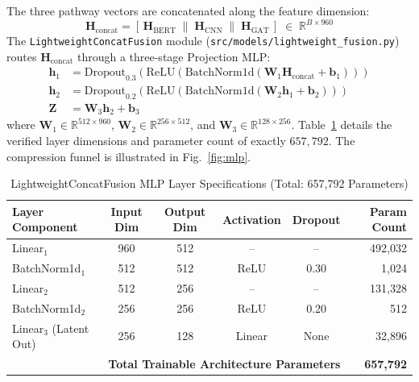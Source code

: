 \documentclass[conference]{IEEEtran}
\begin{document}
The three pathway vectors are concatenated along the feature dimension:
\begin{equation}
    \mathbf{H}_{\text{concat}} = \left[\, \mathbf{H}_{\text{BERT}} \;\|\; \mathbf{H}_{\text{CNN}} \;\|\; \mathbf{H}_{\text{GAT}} \,\right] \;\in\; \mathbb{R}^{B \times 960}
    \label{eq:concat}
\end{equation}
The \texttt{LightweightConcatFusion} module (\texttt{src/models/lightweight_fusion.py}) routes $\mathbf{H}_{\text{concat}}$ through a three-stage Projection MLP:
\begin{align}
    \mathbf{h}_1 &= \text{Dropout}_{0.3}(\text{ReLU}(\text{BatchNorm1d}(\mathbf{W}_1 \mathbf{H}_{\text{concat}} + \mathbf{b}_1))) \label{eq:mlp_l1} \\
    \mathbf{h}_2 &= \text{Dropout}_{0.2}(\text{ReLU}(\text{BatchNorm1d}(\mathbf{W}_2 \mathbf{h}_1 + \mathbf{b}_2))) \label{eq:mlp_l2} \\
    \mathbf{Z}   &= \mathbf{W}_3 \mathbf{h}_2 + \mathbf{b}_3 \label{eq:mlp_l3}
\end{align}
where $\mathbf{W}_1 \in \mathbb{R}^{512 \times 960}$, $\mathbf{W}_2 \in \mathbb{R}^{256 \times 512}$, and $\mathbf{W}_3 \in \mathbb{R}^{128 \times 256}$. Table~\ref{tab:fusion_params} details the verified layer dimensions and parameter count of exactly $657{,}792$. The compression funnel is illustrated in Fig.~\ref{fig:mlp}.

\begin{table}[t]
  \centering
  \caption{LightweightConcatFusion MLP Layer Specifications (Total: 657,792 Parameters)}
  \label{tab:fusion_params}
  \begin{tabular}{lccccr}
    \toprule
    \textbf{Layer Component} & \textbf{Input Dim} & \textbf{Output Dim} & \textbf{Activation} & \textbf{Dropout} & \textbf{Param Count} \\
    \midrule
    Linear$_1$               & 960                & 512                 & --                  & --               & 492,032              \\
    BatchNorm1d$_1$          & 512                & 512                 & ReLU                & 0.30             & 1,024                \\
    Linear$_2$               & 512                & 256                 & --                  & --               & 131,328              \\
    BatchNorm1d$_2$          & 256                & 256                 & ReLU                & 0.20             & 512                  \\
    Linear$_3$ (Latent Out)  & 256                & 128                 & Linear              & None             & 32,896               \\
    \midrule
    \multicolumn{5}{r}{\textbf{Total Trainable Architecture Parameters}}                                 & \textbf{657,792}     \\
    \bottomrule
  \end{tabular}
\end{table}
\end{document}
